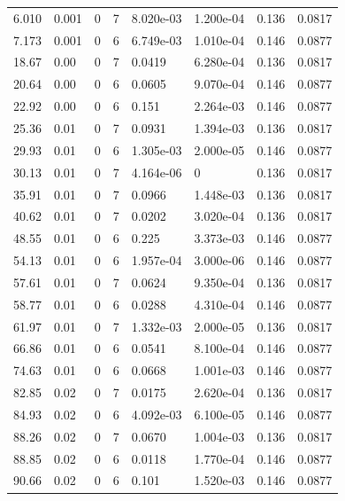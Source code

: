 \documentclass[preview]{standalone}
\begin{document}
{{\begin{tabular}{L{1.2cm}C{1.2cm} C{0.3cm}C{0.5cm} C{1.4cm}C{1.4cm} C{1.4cm}C{1.4cm}}
  6.010  &  0.001  & 0     &  7 &  8.020e-03  & 1.200e-04  & 0.136 &  0.0817   \\ 
  7.173  &  0.001  & 0     &  6 &  6.749e-03  & 1.010e-04  & 0.146 &  0.0877   \\ 
  18.67  &  0.00  & 0     &  7 &  0.0419  & 6.280e-04  & 0.136 &  0.0817   \\ 
  20.64  &  0.00  & 0     &  6 &  0.0605  & 9.070e-04  & 0.146 &  0.0877   \\ 
  22.92  &  0.00  & 0     &  6 &  0.151  & 2.264e-03  & 0.146 &  0.0877   \\ 
  25.36  &  0.01  & 0     &  7 &  0.0931  & 1.394e-03  & 0.136 &  0.0817   \\ 
  29.93  &  0.01  & 0     &  6 &  1.305e-03  & 2.000e-05  & 0.146 &  0.0877   \\ 
  30.13  &  0.01  & 0     &  7 &  4.164e-06  & 0  & 0.136 &  0.0817   \\ 
  35.91  &  0.01  & 0     &  7 &  0.0966  & 1.448e-03  & 0.136 &  0.0817   \\ 
  40.62  &  0.01  & 0     &  7 &  0.0202  & 3.020e-04  & 0.136 &  0.0817   \\ 
  48.55  &  0.01  & 0     &  6 &  0.225  & 3.373e-03  & 0.146 &  0.0877   \\ 
  54.13  &  0.01  & 0     &  6 &  1.957e-04  & 3.000e-06  & 0.146 &  0.0877   \\ 
  57.61  &  0.01  & 0     &  7 &  0.0624  & 9.350e-04  & 0.136 &  0.0817   \\ 
  58.77  &  0.01  & 0     &  6 &  0.0288  & 4.310e-04  & 0.146 &  0.0877   \\ 
  61.97  &  0.01  & 0     &  7 &  1.332e-03  & 2.000e-05  & 0.136 &  0.0817   \\ 
  66.86  &  0.01  & 0     &  6 &  0.0541  & 8.100e-04  & 0.146 &  0.0877   \\ 
  74.63  &  0.01  & 0     &  6 &  0.0668  & 1.001e-03  & 0.146 &  0.0877   \\ 
  82.85  &  0.02  & 0     &  7 &  0.0175  & 2.620e-04  & 0.136 &  0.0817   \\ 
  84.93  &  0.02  & 0     &  6 &  4.092e-03  & 6.100e-05  & 0.146 &  0.0877   \\ 
  88.26  &  0.02  & 0     &  7 &  0.0670  & 1.004e-03  & 0.136 &  0.0817   \\ 
  88.85  &  0.02  & 0     &  6 &  0.0118  & 1.770e-04  & 0.146 &  0.0877   \\ 
  90.66  &  0.02  & 0     &  6 &  0.101  & 1.520e-03  & 0.146 &  0.0877   \\ 

\end{tabular}}}
\end{document}
